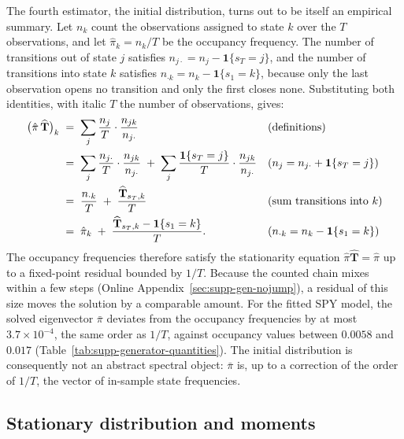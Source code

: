 The fourth estimator, the initial distribution, turns out to be
itself an empirical summary. Let $n_k$ count the observations
assigned to state $k$ over the $T$ observations, and let
$\hat\pi_k = n_k / T$ be the occupancy frequency. The number of
transitions out of state $j$ satisfies
$n_{j\cdot} = n_j - \mathbf{1}\{s_T = j\}$, and the number of
transitions into state $k$ satisfies
$n_{\cdot k} = n_k - \mathbf{1}\{s_1 = k\}$, because only the last
observation opens no transition and only the first closes none.
Substituting both identities, with italic $T$ the number of
observations, gives:
\begin{align}
  \big(\hat\pi\, \widehat{\mathbf{T}}\big)_k
   &\;=\; \sum_j \frac{n_j}{T} \cdot \frac{n_{jk}}{n_{j \cdot}}
     && \text{(definitions)} \notag \\
   &\;=\; \sum_j \frac{n_{j \cdot}}{T} \cdot \frac{n_{jk}}{n_{j \cdot}}
     \;+\; \sum_j \frac{\mathbf{1}\{s_T = j\}}{T}
       \cdot \frac{n_{jk}}{n_{j \cdot}}
     && \text{($n_j = n_{j\cdot} + \mathbf{1}\{s_T = j\}$)} \notag \\
   &\;=\; \frac{n_{\cdot k}}{T}
     \;+\; \frac{\widehat{\mathbf{T}}_{s_T, k}}{T}
     && \text{(sum transitions into $k$)} \notag \\
   &\;=\; \hat\pi_k
     \;+\; \frac{\widehat{\mathbf{T}}_{s_T, k}
       - \mathbf{1}\{s_1 = k\}}{T}.
     && \text{($n_{\cdot k} = n_k - \mathbf{1}\{s_1 = k\}$)}
  \label{eq:supp-fixed-point}
\end{align}
The occupancy frequencies therefore satisfy the stationarity equation
$\hat\pi \widehat{\mathbf{T}} = \hat\pi$ up to a fixed-point residual
bounded by $1/T$. Because the counted chain mixes within a few steps
(Online Appendix~\ref{sec:supp-gen-nojump}), a residual of this size
moves the solution by a comparable amount. For the fitted SPY model,
the solved eigenvector $\bar\pi$ deviates from the occupancy
frequencies by at most $3.7 \times 10^{-4}$, the same order as $1/T$,
against occupancy values
between $0.0058$ and $0.017$ (Table~\ref{tab:supp-generator-quantities}). The
initial distribution is consequently not an abstract spectral object:
$\bar\pi$ is, up to a correction of the order of $1/T$, the vector of
in-sample state frequencies.

\subsection{Stationary distribution and moments}
\label{sec:supp-gen-moments}

